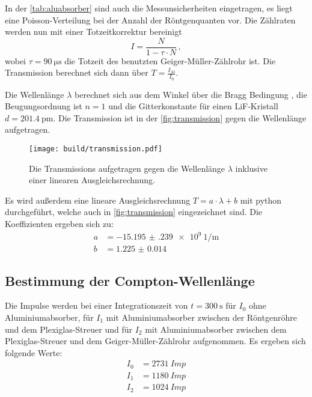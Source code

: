   \noindent In der \autoref{tab:aluabsorber} sind auch die Messunsicherheiten eingetragen, es liegt eine Poisson-Verteilung bei der Anzahl der Röntgenquanten 
  vor. Die Zählraten werden nun mit einer Totzeitkorrektur bereinigt
  \begin{equation*}
    I = \frac{N}{1 - \tau \cdot N} \, , 
  \end{equation*}
  wobei $\tau = \SI{90}{\micro\second}$ die Totzeit des benutzten Geiger-Müller-Zählrohr ist. Die Transmission berechnet sich dann über $T = \frac{I_{\text{Al}}}{I_0}$.

  \noindent Die Wellenlänge $\lambda $ berechnet sich aus dem Winkel über die Bragg Bedingung , die Beugungsordnung ist $n=1$ und die Gitterkonstante für einen 
  LiF-Kristall $d = \SI{201.4}{\pico\metre}$. Die Transmission ist in der \autoref{fig:transmission} gegen die Wellenlänge aufgetragen.

  \begin{figure}[H]
    \centering
    \texttt{[image: build/transmission.pdf]}
    \caption{Die Transmissions aufgetragen gegen die Wellenlänge $\lambda$ inklusive einer linearen Ausgleichsrechnung.}
    \label{fig:transmission}
  \end{figure}

  \noindent Es wird außerdem eine lineare Ausgleichsrechnung $T = a \cdot \lambda + b$ mit python durchgeführt, welche auch in \autoref{fig:transmission} eingezeichnet 
  sind. Die Koeffizienten ergeben sich zu:
  \begin{align*}
    a &= \SI{-15.195(239)e9}{1\per\metre}\\
    b &= \num{1.225(14)}
  \end{align*}


\subsection{Bestimmung der Compton-Wellenlänge} %

  Die Impulse werden bei einer Integrationszeit von $ t = \SI{300}{\second}$ für $I_0$ ohne Aluminiumabsorber, für $I_1$ mit Aluminiumabsorber zwischen der 
  Röntgenröhre und dem Plexiglas-Streuer und für $I_2$ mit Aluminiumabsorber zwischen dem Plexiglas-Streuer und dem Geiger-Müller-Zählrohr aufgenommen. 
  Es ergeben sich 
  folgende Werte:
  \begin{align*}
    I_0 &= \SI{2731}{Imp}\\
    I_1 &= \SI{1180}{Imp}\\
    I_2 &= \SI{1024}{Imp}
  \end{align*}

